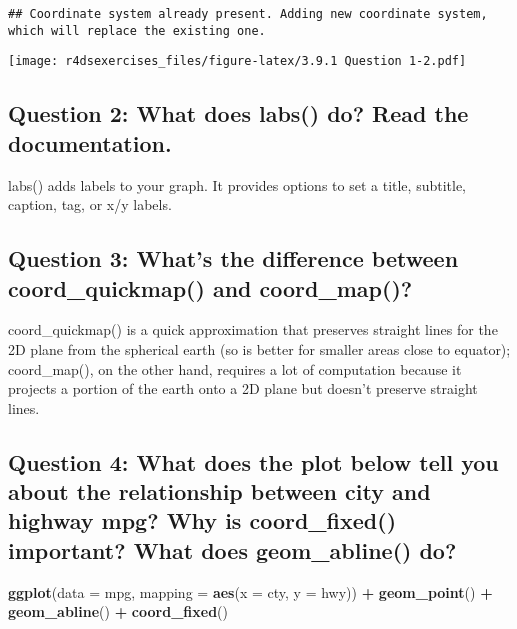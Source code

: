 \documentclass[
]{book}
\newenvironment{Shaded}{\begin{snugshade}}{\end{snugshade}}
\newcommand{\DataTypeTok}[1]{\textcolor[rgb]{0.13,0.29,0.53}{#1}}
\newcommand{\KeywordTok}[1]{\textcolor[rgb]{0.13,0.29,0.53}{\textbf{#1}}}
\newcommand{\NormalTok}[1]{#1}
\newcommand{\OperatorTok}[1]{\textcolor[rgb]{0.81,0.36,0.00}{\textbf{#1}}}
\newcommand{\StringTok}[1]{\textcolor[rgb]{0.31,0.60,0.02}{#1}}
\begin{document}
\begin{verbatim}
## Coordinate system already present. Adding new coordinate system, which will replace the existing one.
\end{verbatim}

\texttt{[image: r4dsexercises\_files/figure-latex/3.9.1 Question 1-2.pdf]}

\hypertarget{question-2-what-does-labs-do-read-the-documentation.}{%
\subsection{Question 2: What does labs() do? Read the documentation.}\label{question-2-what-does-labs-do-read-the-documentation.}}

labs() adds labels to your graph. It provides options to set a title, subtitle, caption, tag, or x/y labels.

\hypertarget{question-3-whats-the-difference-between-coord_quickmap-and-coord_map}{%
\subsection{Question 3: What's the difference between coord\_quickmap() and coord\_map()?}\label{question-3-whats-the-difference-between-coord_quickmap-and-coord_map}}

coord\_quickmap() is a quick approximation that preserves straight lines for the 2D plane from the spherical earth (so is better for smaller areas close to equator); coord\_map(), on the other hand, requires a lot of computation because it projects a portion of the earth onto a 2D plane but doesn't preserve straight lines.

\hypertarget{question-4-what-does-the-plot-below-tell-you-about-the-relationship-between-city-and-highway-mpg-why-is-coord_fixed-important-what-does-geom_abline-do}{%
\subsection{Question 4: What does the plot below tell you about the relationship between city and highway mpg? Why is coord\_fixed() important? What does geom\_abline() do?}\label{question-4-what-does-the-plot-below-tell-you-about-the-relationship-between-city-and-highway-mpg-why-is-coord_fixed-important-what-does-geom_abline-do}}

\begin{Shaded}
\begin{Highlighting}[]
\KeywordTok{ggplot}\NormalTok{(}\DataTypeTok{data =}\NormalTok{ mpg, }\DataTypeTok{mapping =} \KeywordTok{aes}\NormalTok{(}\DataTypeTok{x =}\NormalTok{ cty, }\DataTypeTok{y =}\NormalTok{ hwy)) }\OperatorTok{+}
\StringTok{  }\KeywordTok{geom_point}\NormalTok{() }\OperatorTok{+}\StringTok{ }
\StringTok{  }\KeywordTok{geom_abline}\NormalTok{() }\OperatorTok{+}
\StringTok{  }\KeywordTok{coord_fixed}\NormalTok{()}
\end{Highlighting}
\end{Shaded}
\end{document}
